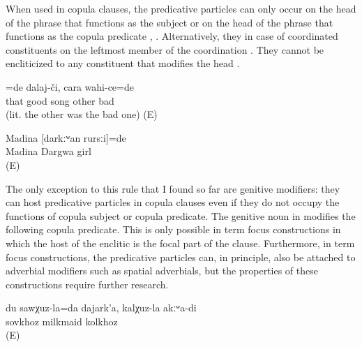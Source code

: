 When used in copula clauses, the predicative particles can only occur on the head of the phrase that functions as the subject  or on the head of the phrase that functions as the copula predicate , . Alternatively, they in case of coordinated constituents on the leftmost member of the coordination . They cannot be encliticized to any constituent that modifies the head . 
%
\begin{exe}
	\ex	\label{ex:‎The good one was a singer, not the bad one}
	\gll	[it	ʡaˁħ-ce]=de	dalaj-či,	cara	wahi-ce=de\\
		that	good	song	other	bad\\
	\glt	{} (lit. the other was the bad one) (E)

	\ex	\label{ex:‎‎‎Madina was a Dargwa girl}
	\begin{xlist}
		\ex	\label{ex:‎‎‎Madina was a Dargwa girl@A}
		\gll	Madina	[darkːʷan	rursːi]=de\\
			Madina	Dargwa	girl\\
		\glt	{} (E)

		 \label{ex:‎‎‎Madina was a Dargwa girl@B}
	\end{xlist}
\end{exe}

The only exception to this rule that I found so far are genitive modifiers: they can host predicative particles in copula clauses even if they do not occupy the functions of copula subject or copula predicate. The genitive noun in  modifies the following copula predicate. This is only possible in term focus constructions in which the host of the enclitic is the focal part of the clause. Furthermore, in term focus constructions, the predicative particles can, in principle, also be attached to adverbial modifiers such as spatial adverbials, but the properties of these constructions require further research.
%
\begin{exe}
	\ex	\label{ex:‎I am milkmaid of the SOVKHOZ, not of the kolkhoz}
	\gll	du	sawχuz-la=da	dajark'a,	kalχuz-la	akːʷa-di\\
			sovkhoz	milkmaid	kolkhoz	\\
	\glt	{} (E)
\end{exe}

